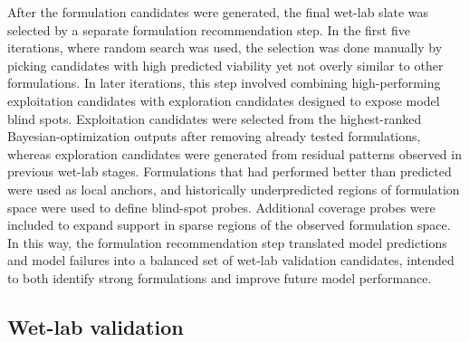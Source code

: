 \documentclass[11pt]{article}
\begin{document}
After the formulation candidates were generated, the final wet-lab slate was selected by a separate formulation recommendation step. In the first five iterations, where random search was used, the selection was done manually by picking candidates with high predicted viability yet not overly similar to other formulations. In later iterations, this step involved combining high-performing exploitation candidates with exploration candidates designed to expose model blind spots. Exploitation candidates were selected from the highest-ranked Bayesian-optimization outputs after removing already tested formulations, whereas exploration candidates were generated from residual patterns observed in previous wet-lab stages. Formulations that had performed better than predicted were used as local anchors, and historically underpredicted regions of formulation space were used to define blind-spot probes. Additional coverage probes were included to expand support in sparse regions of the observed formulation space. In this way, the formulation recommendation step translated model predictions and model failures into a balanced set of wet-lab validation candidates, intended to both identify strong formulations and improve future model performance.

\subsection{Wet-lab validation}
\end{document}
